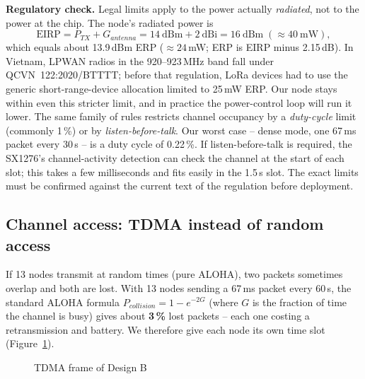 \documentclass[11pt,a4paper]{report}
\begin{document}
\textbf{Regulatory check.} Legal limits apply to the power actually \emph{radiated}, not to the power at the chip. The node's radiated power is
\begin{equation}
  \text{EIRP} = P_{TX} + G_{antenna} = 14\ \text{dBm} + 2\ \text{dBi} = 16\ \text{dBm} \;(\approx 40\ \text{mW}),
\end{equation}
which equals about 13.9\,dBm ERP ($\approx 24$\,mW; ERP is EIRP minus 2.15\,dB). In Vietnam, LPWAN radios in the 920--923\,MHz band fall under QCVN~122:2020/BTTTT; before that regulation, LoRa devices had to use the generic short-range-device allocation limited to 25\,mW ERP. Our node stays within even this stricter limit, and in practice the power-control loop will run it lower. The same family of rules restricts channel occupancy by a \emph{duty-cycle} limit (commonly 1\,\%) or by \emph{listen-before-talk}. Our worst case -- dense mode, one 67\,ms packet every 30\,s -- is a duty cycle of 0.22\,\%. If listen-before-talk is required, the SX1276's channel-activity detection can check the channel at the start of each slot; this takes a few milliseconds and fits easily in the 1.5\,s slot. The exact limits must be confirmed against the current text of the regulation before deployment.

\subsection{Channel access: TDMA instead of random access}
If 13 nodes transmit at random times (pure ALOHA), two packets sometimes overlap and both are lost. With 13 nodes sending a 67\,ms packet every 60\,s, the standard ALOHA formula $P_{collision} = 1 - e^{-2G}$ (where $G$ is the fraction of time the channel is busy) gives about \textbf{3\,\%} lost packets -- each one costing a retransmission and battery. We therefore give each node its own time slot (Figure~\ref{fig:tdma}).

\begin{figure}[htbp]
\centering
{}
\caption{TDMA frame of Design B}\label{fig:tdma}
\end{figure}
\end{document}
